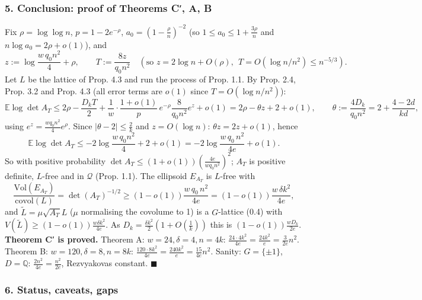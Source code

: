 \hypertarget{conclusion-proof-of-theorems-c-a-b}{%
\subsubsection*{5. Conclusion: proof of Theorems C′, A, B}\label{conclusion-proof-of-theorems-c-a-b}}

Fix \(\rho=\log\log n\), \(p=1-2e^{-\rho}\), \(a_0=(1-\frac\rho n)^{-2}\) (so \(1\le a_0\le1+\frac{3\rho}n\) and \(n\log a_0=2\rho+o(1)\)), and
\[z:=\log\frac{w\,q_0n^2}{4}+\rho,\qquad T:=\frac{8z}{q_0n^2}\quad(\text{so } z=2\log n+O(\rho),\ \ T=O(\log n/n^2)\le n^{-5/3}).\]
Let \(L\) be the lattice of Prop. 4.3 and run the process of Prop. 1.1. By Prop. 2.4, Prop. 3.2 and Prop. 4.3 (all error terms are \(o(1)\) since \(T=O(\log n/n^2)\)):
\[\mathbb E\log\det A_T\le2\rho-\frac{D_kT}2+\frac1w\cdot\frac{1+o(1)}p\,e^{-\rho}\frac{8}{q_0n^2}e^z+o(1)=2\rho-\theta z+2+o(1),\qquad\theta:=\frac{4D_k}{q_0n^2}=2+\frac{4-2d}{kd},\]
using \(e^z=\frac{wq_0n^2}4e^\rho\). Since \(|\theta-2|\le\frac2k\) and \(z=O(\log n)\): \(\theta z=2z+o(1)\), hence
\[\mathbb E\log\det A_T\le-2\log\frac{w\,q_0n^2}{4}+2+o(1)=-2\log\frac{w\,q_0\,n^2}{4e}+o(1).\]
So with positive probability \(\det A_T\le(1+o(1))(\frac{4e}{wq_0n^2})^2\); \(A_T\) is positive definite, \(L\)-free and in \(\mathcal Q\) (Prop. 1.1). The ellipsoid \(E_{A_T}\) is \(L\)-free with
\[\frac{\mathrm{Vol}(E_{A_T})}{\mathrm{covol}(L)}=\det(A_T)^{-1/2}\ge(1-o(1))\frac{w\,q_0\,n^2}{4e}=(1-o(1))\frac{w\,\delta k^2}{4e},\]
and \(\tilde L=\mu\sqrt{A_T}L\) (\(\mu\) normalising the covolume to 1) is a \(G\)-lattice (0.4) with \(V(\tilde L)\ge(1-o(1))\frac{w\delta k^2}{4e}\). As \(D_k=\frac{\delta k^2}2(1+O(\frac1k))\) this is
\((1-o(1))\frac{wD_k}{2e}\). \textbf{Theorem C′ is proved.} Theorem A: \(w=24,\delta=4,n=4k\): \(\frac{24\cdot4k^2}{4e}=\frac{24k^2}e=\frac{3}{2e}n^2\). Theorem B: \(w=120,\delta=8,n=8k\):
\(\frac{120\cdot 8k^2}{4e}=\frac{240k^2}{e}=\frac{15}{4e}n^2\). Sanity: \(G=\{\pm1\}\), \(D=\mathbb Q\): \(\frac{2n^2}{4e}=\frac{n^2}{2e}\), Rezvyakova\textquotesingle s constant. \(\blacksquare\)

\hypertarget{status-caveats-gaps}{%
\subsubsection*{6. Status, caveats, gaps}\label{status-caveats-gaps}}

